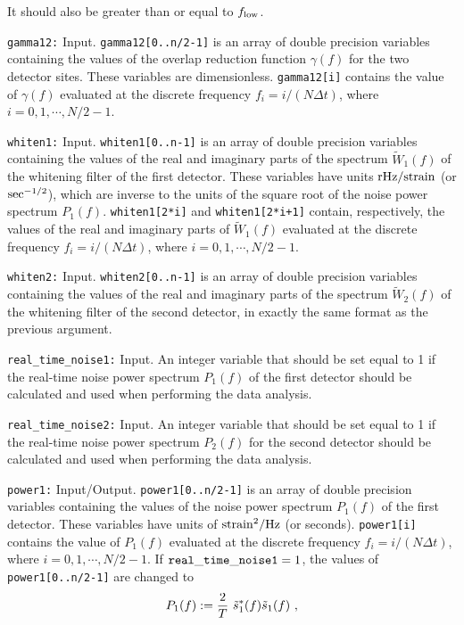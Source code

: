 \begin{description}
It should also be greater than or equal to $f_{\rm low}$.
%
\item{\tt gamma12:} Input.
{\tt gamma12[0..n/2-1]} is an array of double precision variables 
containing the values of the overlap reduction function $\gamma(f)$ 
for the two detector sites.
These variables are dimensionless.
{\tt gamma12[i]} contains the value of $\gamma(f)$ evaluated at the 
discrete frequency $f_i=i/(N\Delta t)$, where $i=0,1,\cdots,N/2-1$.
%
\item{\tt whiten1:} Input.
{\tt whiten1[0..n-1]} is an array of double precision variables 
containing the values of the real and imaginary parts of the spectrum 
$\tilde W_1(f)$ of the whitening filter of the first detector.
These variables have units ${\rm rHz}/{\rm strain}$ 
(or ${\rm sec}^{-1/2}$), which are inverse to the units of the square 
root of the noise power spectrum $P_1(f)$.
{\tt whiten1[2*i]} and {\tt whiten1[2*i+1]} contain, respectively, 
the values of the real and imaginary parts of $\tilde W_1(f)$
evaluated at the discrete frequency $f_i=i/(N\Delta t)$, where 
$i=0,1,\cdots,N/2-1$.
%
\item{\tt whiten2:} Input. 
{\tt whiten2[0..n-1]} is an array of double precision variables 
containing the values of the real and imaginary parts of the spectrum 
$\tilde W_2(f)$ of the whitening filter of the second detector,
in exactly the same format as the previous argument.
%
\item{\tt real\_time\_noise1:} Input.
An integer variable that should be set equal to 1 if the real-time 
noise power spectrum $P_1(f)$ of the first detector should be
calculated and used when performing the data analysis.
%
\item{\tt real\_time\_noise2:} Input.  
An integer variable that should be set equal to 1 if the real-time 
noise power spectrum $P_2(f)$ for the second detector should be
calculated and used when performing the data analysis.
%
\item{\tt power1:} Input/Output.  
{\tt power1[0..n/2-1]} is an array of double precision variables 
containing the values of the noise power spectrum $P_1(f)$ of the 
first detector.
These variables have units of ${\rm strain}^2/{\rm Hz}$ (or seconds).
{\tt power1[i]} contains the value of $P_1(f)$ evaluated at the discrete
frequency $f_i=i/(N\Delta t)$, where $i=0,1,\cdots,N/2-1$.
If ${\tt real\_time\_noise1}=1$, the values of {\tt power1[0..n/2-1]} 
are changed to 
%
\begin{equation}
P_1(f):={2\over T}\ \tilde s_1^*(f)\tilde s_1(f)\ ,
\end{equation}

\end{description}
